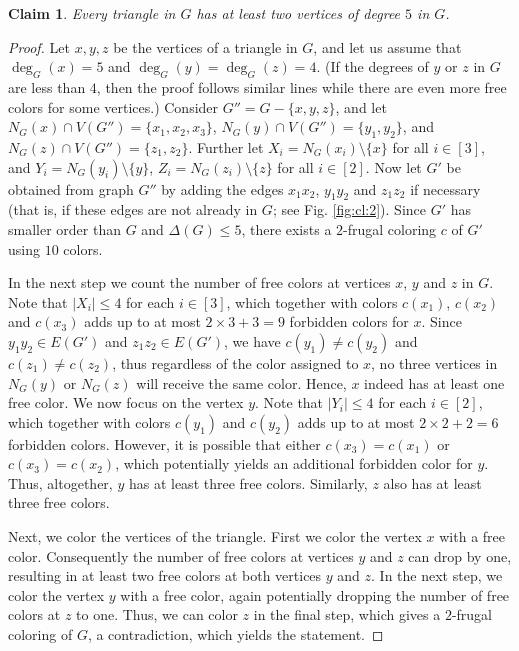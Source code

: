 \documentclass[11pt]{article}
\newtheorem{claim}{Claim}
\begin{document}
\begin{claim} Every triangle in $G$ has at least two vertices of degree $5$ in $G$.
\label{cl:2}
\end{claim} 
\begin{proof}
Let $x,y,z$ be the vertices of a triangle in $G$, and let us assume that $\deg_G(x)=5$ and $\deg_G(y)=\deg_G(z)=4$. (If the degrees of $y$ or $z$ in $G$ are less than $4$, then the proof follows similar lines while there are even more free colors for some vertices.) Consider $G''=G-\{x,y,z\}$, and let $N_G(x) \cap V(G'')=\{x_1,x_2,x_3\}$, $N_G(y) \cap V(G'')=\{y_1,y_2\}$, and $N_G(z) \cap V(G'')=\{z_1,z_2\}$. Further let $X_i=N_G(x_i)\setminus\{x\}$ for all $i\in[3]$, and $Y_i=N_G(y_i)\setminus\{y\}$, $Z_i=N_G(z_i)\setminus\{z\}$ for all $i \in [2]$. Now let $G'$ be obtained from graph $G''$ by adding the edges $x_1x_2$, $y_1y_2$ and $z_1z_2$ if necessary (that is, if these edges are not already in $G$; see Fig. \ref{fig:cl:2}). Since $G'$ has smaller order than $G$ and $\Delta(G)\le 5$, there exists a $2$-frugal coloring $c$ of $G'$ using $10$ colors.

In the next step we count the number of free colors at vertices $x$, $y$ and $z$ in $G$. Note that $|X_i| \le 4$ for each $i\in [3]$, which together with colors $c(x_1)$, $c(x_2)$ and $c(x_3)$ adds up to at most $2 \times 3 + 3=9$ forbidden colors for $x$. Since $y_1y_2 \in E(G')$ and $z_1z_2 \in E(G')$, we have $c(y_1) \ne c(y_2)$ and $c(z_1) \ne c(z_2)$, thus regardless of the color assigned to $x$, no three vertices in $N_G(y)$ or $N_G(z)$ will receive the same color. Hence, $x$ indeed has at least one free color. We now focus on the vertex $y$. Note that $|Y_i| \le 4$ for each $i\in [2]$, which together with colors $c(y_1)$ and $c(y_2)$ adds up to at most $2 \times 2 +2=6$ forbidden colors. However, it is possible that either $c(x_3)=c(x_1)$ or $c(x_3)=c(x_2)$, which potentially yields an additional forbidden color for $y$. Thus, altogether, $y$ has at least three free colors. Similarly, $z$ also has at least three free colors.

Next, we color the vertices of the triangle. First we color the vertex $x$ with a free color. Consequently the number of free colors at vertices $y$ and $z$ can drop by one, resulting in at least two free colors at both vertices $y$ and $z$. In the next step, we color the vertex $y$ with a free color, again potentially dropping the number of free colors at $z$ to one. Thus, we can color $z$ in the final step, which gives a $2$-frugal coloring of $G$, a contradiction, which yields the statement.
\end{proof}
\end{document}
